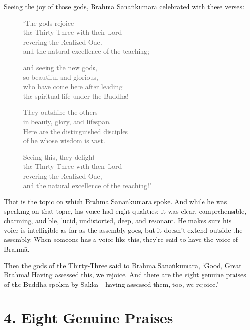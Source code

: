\documentclass[12pt,openany]{book}%
\begin{document}
Seeing the joy of those gods, \textsanskrit{Brahmā} \textsanskrit{Sanaṅkumāra} celebrated with these verses: 

\begin{verse}%
‘The gods rejoice—\\
the Thirty-Three with their Lord—\\
revering the Realized One, \\
and the natural excellence of the teaching; 

and seeing the new gods, \\
so beautiful and glorious, \\
who have come here after leading \\
the spiritual life under the Buddha! 

They outshine the others \\
in beauty, glory, and lifespan. \\
Here are the distinguished disciples \\
of he whose wisdom is vast. 

Seeing this, they delight—\\
the Thirty-Three with their Lord—\\
revering the Realized One, \\
and the natural excellence of the teaching!’ 

%
\end{verse}

That is the topic on which \textsanskrit{Brahmā} \textsanskrit{Sanaṅkumāra} spoke. And while he was speaking on that topic, his voice had eight qualities: it was clear, comprehensible, charming, audible, lucid, undistorted, deep, and resonant. He makes sure his voice is intelligible as far as the assembly goes, but it doesn’t extend outside the assembly. When someone has a voice like this, they’re said to have the voice of \textsanskrit{Brahmā}. 

Then the gods of the Thirty-Three said to \textsanskrit{Brahmā} \textsanskrit{Sanaṅkumāra}, ‘Good, Great \textsanskrit{Brahmā}! Having assessed this, we rejoice. And there are the eight genuine praises of the Buddha spoken by Sakka—having assessed them, too, we rejoice.’ 

\section*{4. Eight Genuine Praises }
\end{document}
